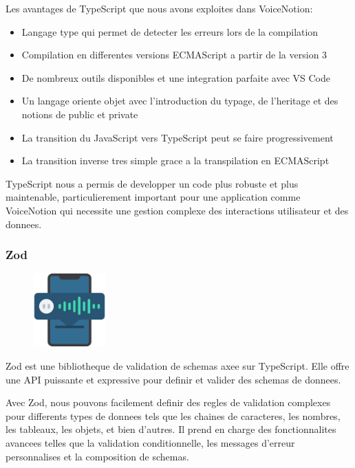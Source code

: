 Les avantages de TypeScript que nous avons exploites dans VoiceNotion:
\begin{itemize}
    \item Langage type qui permet de detecter les erreurs lors de la compilation
    \item Compilation en differentes versions ECMAScript a partir de la version 3
    \item De nombreux outils disponibles et une integration parfaite avec VS Code
    \item Un langage oriente objet avec l'introduction du typage, de l'heritage et des notions de public et private
    \item La transition du JavaScript vers TypeScript peut se faire progressivement
    \item La transition inverse tres simple grace a la transpilation en ECMAScript
\end{itemize}

TypeScript nous a permis de developper un code plus robuste et plus maintenable, particulierement important pour une application comme VoiceNotion qui necessite une gestion complexe des interactions utilisateur et des donnees.

\subsubsection{Zod}
\begin{figure}
    \centering
    \includegraphics[width=0.25\textwidth]{assets/docs/logo_zod.png}
\end{figure}
Zod est une bibliotheque de validation de schemas axee sur TypeScript. Elle offre une API puissante et expressive pour definir et valider des schemas de donnees. 

Avec Zod, nous pouvons facilement definir des regles de validation complexes pour differents types de donnees tels que les chaines de caracteres, les nombres, les tableaux, les objets, et bien d'autres. Il prend en charge des fonctionnalites avancees telles que la validation conditionnelle, les messages d'erreur personnalises et la composition de schemas.

